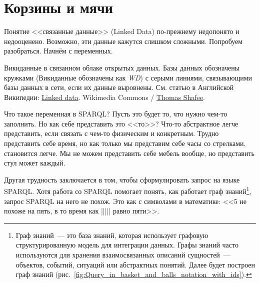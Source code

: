 \chapter{Корзины и мячи}
\label{ch:BucketsAndBalls}

Понятие <<связанные данные>> (Linked Data) по-прежнему недопонято и недооценено. Возможно, эти данные кажутся слишком сложными. 
Попробуем разобраться. Начнём с переменных.

\begin{marginfigure}[-5\baselineskip]
	{
		\setlength{\fboxsep}{0pt}%
		\setlength{\fboxrule}{1pt}%
	}
    \caption[Викиданные в связанном облаке открытых данных.]{Викиданные в связанном облаке открытых данных. Базы данных обозначены кружками (Викиданные обозначены как \textit{WD}) с серыми линиями, связывающими базы данных в сети, если их данные выровнены. См. статью в Английской Википедии: \href{https://en.wikipedia.org/wiki/Linked_data}{Linked data}. Wikimedia Commons / \href{https://commons.wikimedia.org/wiki/File:Wikidata_in_the_Linked_Open_Data_cloud_2020-08-20.svg}{Thomas Shafee}.}
	\label{fig:Wikidata_in_linked_open_data}
\end{marginfigure}

Что такое переменная в SPARQL? Пусть это будет то, что нужно чем-то заполнить. Но как себе представить это <<то>>? Что-то абстрактное легче представить, если связать с чем-то физическим и конкретным. Трудно представить себе время, но как только мы представим себе часы со стрелками, становится легче. Мы не можем представить себе мебель вообще, но представить стул может каждый.

Другая трудность заключается в том, 
чтобы сформулировать запрос на языке SPARQL. 
Хотя работа со SPARQL помогает понять, как работает граф знаний\footnote[][12pt]{%
%
%
Граф знаний~--- это база знаний, которая использует графовую структурированную модель для интеграции данных. 
Графы знаний часто используются для хранения взаимосвязанных описаний сущностей~--- объектов, 
событий, ситуаций или абстрактных понятий. 
Далее будет построен граф знаний (рис.~\ref{fig:Query_in_basket_and_balls_notation_with_ids}).%
}, 
запрос SPARQL на него не похож. Это как с символами в математике: <<5 не похоже на пять, в то время как ||||| равно пяти>>.

